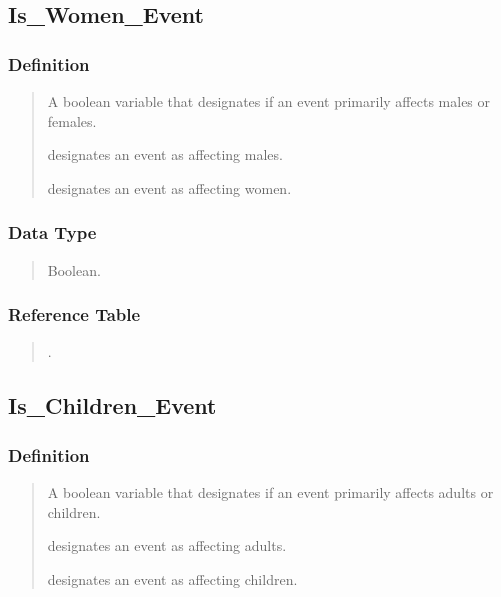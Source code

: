 \documentclass[letterpaper,10pt,english]{sphinxmanual}
\begin{document}
\subsection{Is\_Women\_Event}
\label{\detokenize{database_schema:is-women-event}}

\subsubsection{Definition}
\label{\detokenize{database_schema:id79}}\begin{quote}

\sphinxAtStartPar
A boolean variable that designates if an event primarily affects males or females.

 designates an event as affecting males.

 designates an event as affecting women.
\end{quote}


\subsubsection{Data Type}
\label{\detokenize{database_schema:id80}}\begin{quote}

\sphinxAtStartPar
Boolean.
\end{quote}


\subsubsection{Reference Table}
\label{\detokenize{database_schema:id81}}\begin{quote}

\sphinxAtStartPar
{\hyperref[\detokenize{database_schema:overview-table}]{}}.
\end{quote}


\subsection{Is\_Children\_Event}
\label{\detokenize{database_schema:is-children-event}}

\subsubsection{Definition}
\label{\detokenize{database_schema:id82}}\begin{quote}

\sphinxAtStartPar
A boolean variable that designates if an event primarily affects adults or children.

 designates an event as affecting adults.

 designates an event as affecting children.
\end{quote}
\end{document}
